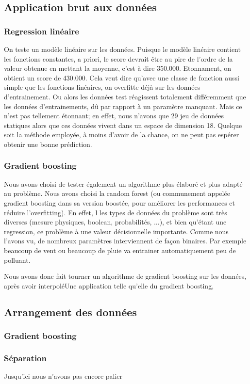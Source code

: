 \subsection{Application brut aux données}

\subsubsection{Regression linéaire}

On teste un modèle linéaire sur les données.
Puisque le modèle linéaire contient les fonctions constantes, a priori, le score devrait être au pire de l'ordre de la valeur obtenue en mettant la moyenne, c'est à dire 350.000.
Etonnament, on obtient un score de 430.000.
Cela veut dire qu'avec une classe de fonction aussi simple que les fonctions linéaires, on overfitte déjà sur les données d'entrainement. Ou alors les données test réagissent totalement différemment que les données d'entrainements, dû par rapport à un paramètre manquant. 
Mais ce n'est pas tellement étonnant; en effet, nous n'avons que 29 jeu de données statiques alors que ces données vivent dans un espace de dimension 18.
Quelque soit la méthode employée, à moins d'avoir de la chance, on ne peut pas espérer obtenir une bonne prédiction.

\subsubsection{Gradient boosting}

Nous avons choisi de tester également un algorithme plus élaboré et plus adapté au problème. Nous avons choisi la random forest (ou communement appelée gradient boosting dans sa version boostée, pour améliorer les performances et réduire l'overfitting). En effet, l les types de données du problème sont très diverses (mesure physiques, boolean, probabilités, ...), et bien qu'étant une regression, ce problème à une valeur décisionnelle importante. Comme nous l'avons vu, de nombreux paramètres interviennent de façon binaires. Par exemple beaucoup de vent ou beaucoup de pluie va entrainer automatiquement peu de polluant. 

Nous avons donc fait tourner un algorithme de gradient boosting sur les données, après avoir interpoléUne application telle qu'elle du gradient boosting, 


\subsection{Arrangement des données}

\subsubsection{Gradient boosting}


\subsubsection{Séparation}

Jusqu'ici nous n'avons pas encore palier 